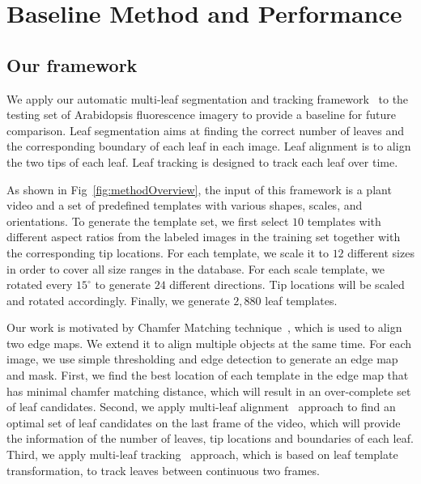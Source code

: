 

\section{Baseline Method and Performance}
\label{sec:baseline}
\subsection{Our framework}
We apply our automatic multi-leaf segmentation and tracking framework~\cite{yin2014a,yin2014b} to the testing set of Arabidopsis fluorescence imagery to provide a baseline for future comparison.
Leaf segmentation aims at finding the correct number of leaves and the corresponding boundary of each leaf in each image.
Leaf alignment is to align the two tips of each leaf.
Leaf tracking is designed to track each leaf over time.




As shown in Fig~\ref{fig:methodOverview}, the input of this framework is a plant video and a set of predefined templates with various shapes, scales, and orientations.
To generate the template set, we first select $10$ templates with different aspect ratios from the labeled images in the training set together with the corresponding tip locations.
For each template, we scale it to $12$ different sizes in order to cover all size ranges in the database.
For each scale template, we rotated every $15^{\circ}$ to generate $24$ different directions.
Tip locations will be scaled and rotated accordingly.
Finally, we generate $2,880$ leaf templates.


Our work is motivated by Chamfer Matching technique~\cite{barrow1977parametric}, which is used to align two edge maps.
We extend it to align multiple objects at the same time.
For each image, we use simple thresholding and edge detection to generate an edge map and mask.
First, we find the best location of each template in the edge map that has minimal chamfer matching distance, which will result in an over-complete set of leaf candidates.
Second, we apply multi-leaf alignment~\cite{yin2014a} approach to find an optimal set of leaf candidates on the last frame of the video, which will provide the information of the number of leaves, tip locations and boundaries of each leaf.
Third, we apply multi-leaf tracking~\cite{yin2014b} approach, which is based on leaf template transformation, to track leaves between continuous two frames.

